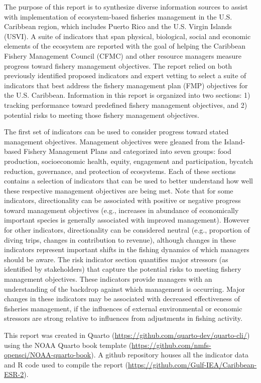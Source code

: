 \documentclass[
  letterpaper,
  oneside,
  open=any]{scrbook}
\begin{document}
The purpose of this report is to synthesize diverse information sources
to assist with implementation of ecosystem-based fisheries management in
the U.S. Caribbean region, which includes Puerto Rico and the U.S.
Virgin Islands (USVI). A suite of indicators that span physical,
biological, social and economic elements of the ecosystem are reported
with the goal of helping the Caribbean Fishery Management Council (CFMC)
and other resource managers measure progress toward fishery management
objectives. The report relied on both previously identified proposed
indicators and expert vetting to select a suite of indicators that best
address the fishery management plan (FMP) objectives for the U.S.
Caribbean. Information in this report is organized into two sections: 1)
tracking performance toward predefined fishery management objectives,
and 2) potential risks to meeting those fishery management objectives.

The first set of indicators can be used to consider progress toward
stated management objectives. Management objectives were gleaned from
the Island-based Fishery Management Plans and categorized into seven
groups: food production, socioeconomic health, equity, engagement and
participation, bycatch reduction, governance, and protection of
ecosystems. Each of these sections contains a selection of indicators
that can be used to better understand how well these respective
management objectives are being met. Note that for some indicators,
directionality can be associated with positive or negative progress
toward management objectives (e.g., increases in abundance of
economically important species is generally associated with improved
management). However for other indicators, directionality can be
considered neutral (e.g., proportion of diving trips, changes in
contribution to revenue), although changes in these indicators represent
important shifts in the fishing dynamics of which managers should be
aware. The risk indicator section quantifies major stressors (as
identified by stakeholders) that capture the potential risks to meeting
fishery management objectives. These indicators provide managers with an
understanding of the backdrop against which management is occurring.
Major changes in these indicators may be associated with decreased
effectiveness of fisheries management, if the influences of external
environmental or economic stressors are strong relative to influences
from adjustments in fishing activity.

This report was created in Quarto
(\url{https://github.com/quarto-dev/quarto-cli/}) using the NOAA Quarto
book template
(\hyperref[0]{https://github.com/nmfs-opensci/NOAA-quarto-book}). A
github repository houses all the indicator data and R code used to
compile the report
(\hyperref[0]{https://github.com/Gulf-IEA/Caribbean-ESR-2}).
\end{document}
